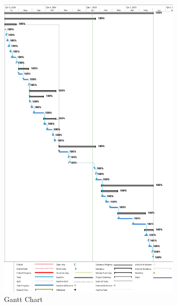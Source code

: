 \begin{figure}[h!]  
    \centering
    \includegraphics[width=0.79\textwidth]{Images/Gantt Chart.png}  
    \caption{Gantt Chart}
    \label{Gantt Chart}  %
\end{figure}

\pagebreak

